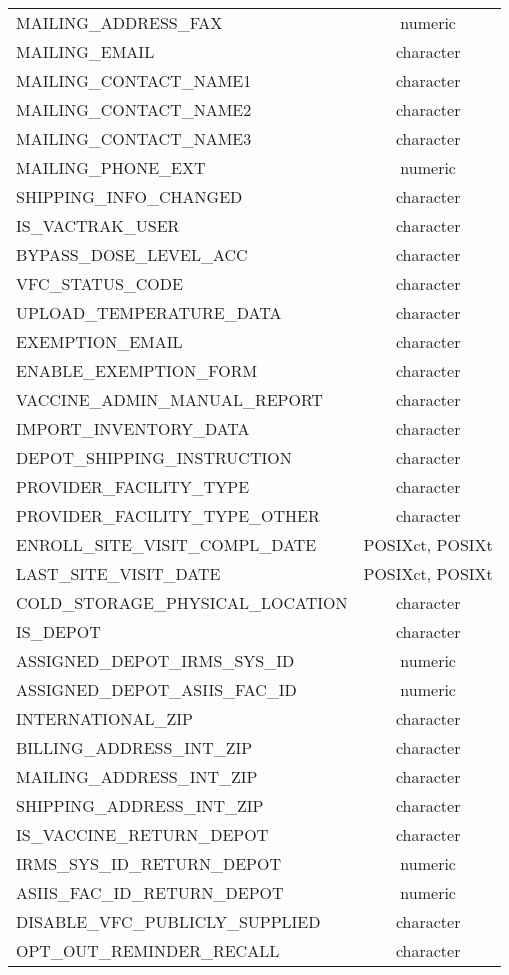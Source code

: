 \documentclass[
  letterpaper,
  DIV=11,
  numbers=noendperiod]{scrreprt}
\begin{document}
\begin{longtable}{lc}
MAILING\_ADDRESS\_FAX & numeric \\ 
MAILING\_EMAIL & character \\ 
MAILING\_CONTACT\_NAME1 & character \\ 
MAILING\_CONTACT\_NAME2 & character \\ 
MAILING\_CONTACT\_NAME3 & character \\ 
MAILING\_PHONE\_EXT & numeric \\ 
SHIPPING\_INFO\_CHANGED & character \\ 
IS\_VACTRAK\_USER & character \\ 
BYPASS\_DOSE\_LEVEL\_ACC & character \\ 
VFC\_STATUS\_CODE & character \\ 
UPLOAD\_TEMPERATURE\_DATA & character \\ 
EXEMPTION\_EMAIL & character \\ 
ENABLE\_EXEMPTION\_FORM & character \\ 
VACCINE\_ADMIN\_MANUAL\_REPORT & character \\ 
IMPORT\_INVENTORY\_DATA & character \\ 
DEPOT\_SHIPPING\_INSTRUCTION & character \\ 
PROVIDER\_FACILITY\_TYPE & character \\ 
PROVIDER\_FACILITY\_TYPE\_OTHER & character \\ 
ENROLL\_SITE\_VISIT\_COMPL\_DATE & POSIXct, POSIXt \\ 
LAST\_SITE\_VISIT\_DATE & POSIXct, POSIXt \\ 
COLD\_STORAGE\_PHYSICAL\_LOCATION & character \\ 
IS\_DEPOT & character \\ 
ASSIGNED\_DEPOT\_IRMS\_SYS\_ID & numeric \\ 
ASSIGNED\_DEPOT\_ASIIS\_FAC\_ID & numeric \\ 
INTERNATIONAL\_ZIP & character \\ 
BILLING\_ADDRESS\_INT\_ZIP & character \\ 
MAILING\_ADDRESS\_INT\_ZIP & character \\ 
SHIPPING\_ADDRESS\_INT\_ZIP & character \\ 
IS\_VACCINE\_RETURN\_DEPOT & character \\ 
IRMS\_SYS\_ID\_RETURN\_DEPOT & numeric \\ 
ASIIS\_FAC\_ID\_RETURN\_DEPOT & numeric \\ 
DISABLE\_VFC\_PUBLICLY\_SUPPLIED & character \\ 
OPT\_OUT\_REMINDER\_RECALL & character \\ 

\end{longtable}
\end{document}
